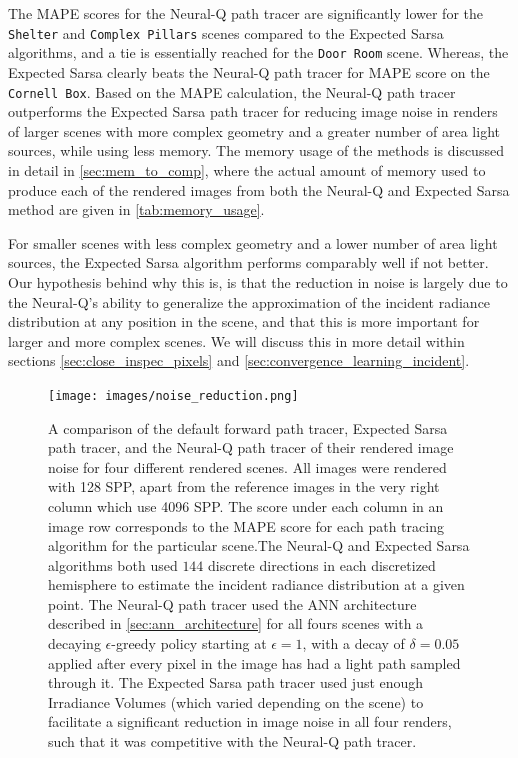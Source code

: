 \documentclass[../dissertation.tex]{subfiles}
\begin{document}
The MAPE scores for the Neural-Q path tracer are significantly lower for the \verb|Shelter| and \verb|Complex Pillars| scenes compared to the Expected Sarsa algorithms, and a tie is essentially reached for the \verb|Door Room| scene. Whereas, the Expected Sarsa clearly beats the Neural-Q path tracer for MAPE score on the \verb|Cornell Box|. Based on the MAPE calculation, the Neural-Q path tracer outperforms the Expected Sarsa path tracer for reducing image noise in renders of larger scenes with more complex geometry and a greater number of area light sources, while using less memory. The memory usage of the methods is discussed in detail in \ref{sec:mem_to_comp}, where the actual amount of memory used to produce each of the rendered images from both the Neural-Q and Expected Sarsa method are given in \ref{tab:memory_usage}. 

For smaller scenes with less complex geometry and a lower number of area light sources, the Expected Sarsa algorithm performs comparably well if not better. Our hypothesis behind why this is, is that the reduction in noise is largely due to the Neural-Q's ability to generalize the approximation of the incident radiance distribution at any position in the scene, and that this is more important for larger and more complex scenes. We will discuss this in more detail within sections \ref{sec:close_inspec_pixels} and \ref{sec:convergence_learning_incident}.

\begin{figure}[hbtp]
\begin{center}
\texttt{[image: images/noise\_reduction.png]}    
\end{center}
\caption{A comparison of the default forward path tracer, Expected Sarsa path tracer, and the Neural-Q path tracer of their rendered image noise for four different rendered scenes. All images were rendered with 128 SPP, apart from the reference images in the very right column which use 4096 SPP. The score under each column in an image row corresponds to the MAPE score for each  path tracing algorithm for the particular scene.The Neural-Q and Expected Sarsa algorithms both used $144$ discrete directions in each discretized hemisphere to estimate the incident radiance distribution at a given point. The Neural-Q path tracer used the ANN architecture described in \ref{sec:ann_architecture} for all fours scenes with a decaying $\epsilon$-greedy policy starting at $\epsilon =1$, with a decay of $\delta = 0.05$ applied after every pixel in the image has had a light path sampled through it. The Expected Sarsa path tracer used just enough Irradiance Volumes (which varied depending on the scene) to facilitate a significant reduction in image noise in all four renders, such that it was competitive with the Neural-Q path tracer.}
\label{fig:mape_results_grid}
\end{figure}
\end{document}
